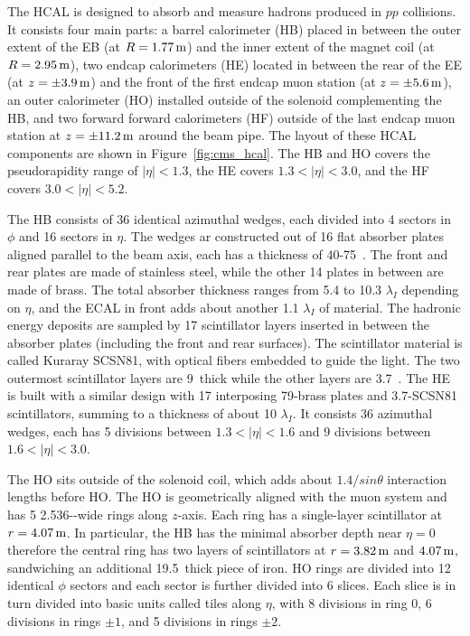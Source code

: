 The HCAL is designed to absorb and measure hadrons produced in $pp$ collisions.
It consists four main parts: a barrel calorimeter (HB) placed in between the outer extent of the EB (at $R = 1.77 \meter$) and the inner extent of the magnet coil (at $R = 2.95 \meter$),
two endcap calorimeters (HE) located in between the rear of the EE (at $z = \pm 3.9 \meter$) and the front of the first endcap muon station (at $z = \pm 5.6 \meter$),
an outer calorimeter (HO) installed outside of the solenoid complementing the HB,
and two forward forward calorimeters (HF) outside of the last endcap muon station at $z = \pm 11.2 \meter$ around the beam pipe.
The layout of these HCAL components are shown in Figure~\ref{fig:cms_hcal}.
The HB and HO covers the pseudorapidity range of $|\eta| < 1.3$, the HE covers $1.3 < |\eta| < 3.0$,
and the HF covers $3.0 < |\eta| < 5.2$.

The HB consists of 36 identical azimuthal wedges, each divided into 4 sectors in $\phi$ and 16 sectors in $\eta$.
The wedges ar constructed out of 16 flat absorber plates aligned parallel to the beam axis, each has a thickness of 40-75~\mm.
The front and rear plates are made of stainless steel, while the other 14 plates in between are made of brass.
The total absorber thickness ranges from 5.4 to 10.3 $\lambda_{I}$ depending on $\eta$, and the ECAL in front adds about another 1.1 $\lambda_{I}$ of material.
The hadronic energy deposits are sampled by 17 scintillator layers inserted in between the absorber plates (including the front and rear surfaces).
The scintillator material is called Kuraray SCSN81, with optical fibers embedded to guide the light.
The two outermost scintillator layers are 9~\mm thick while the other layers are 3.7~\mm.
The HE is built with a similar design with 17 interposing 79-\mm brass plates and 3.7-\mm SCSN81 scintillators, summing to a thickness of about 10 $\lambda_{I}$.
It consists 36 azimuthal wedges, each has 5 divisions between $1.3 < |\eta| < 1.6$ and 9 divisions between $1.6 < |\eta| < 3.0$.

The HO sits outside of the solenoid coil, which adds about $1.4 / sin\theta$ interaction lengths before HO.
The HO is geometrically aligned with the muon system and has 5 2.536-\meter-wide rings along $z$-axis.
Each ring has a single-layer scintillator at $r = 4.07 \meter$.
In particular, the HB has the minimal absorber depth near $\eta = 0$ therefore the central ring has 
two layers of scintillators at $r = 3.82 \meter$ and $4.07 \meter$, sandwiching an additional 19.5~\cm thick piece of iron.
HO rings are divided into 12 identical $\phi$ sectors and each sector is further divided into 6 slices.
Each slice is in turn divided into basic units called tiles along $\eta$, with 8 divisions in ring 0, 6 divisions in rings $\pm 1$, and 5 divisions in rings $\pm 2$. 

